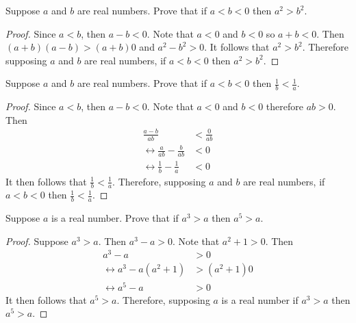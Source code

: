 \begin{tcolorbox}[title=Problem 5, breakable]
    Suppose $a$ and $b$ are real numbers. Prove that if $a < b < 0$ then $a^2 > b^2$.
\end{tcolorbox}

\begin{proof}
    Since $a < b$, then $a - b < 0$. Note that $a < 0$ and $b < 0$ so $a + b < 0$. 
    Then $(a + b)(a - b) > (a + b)0$ and $a^2 - b^2 > 0$. It follows that $a^2 > b^2$.
    Therefore supposing $a$ and $b$ are real numbers, if $a < b < 0$ then $a^2 > b^2$.
\end{proof}

\begin{tcolorbox}[title=Problem 6, breakable]
    Suppose $a$ and $b$ are real numbers. Prove that if $a < b < 0$ then $\frac{1}{b} < \frac{1}{a}$.
\end{tcolorbox}

\begin{proof}
    Since $a < b$, then $a - b < 0$. Note that $a < 0$ and $b < 0$ therefore $ab > 0$. Then
    \begin{align*}
        \frac{a - b}{ab}                            & < \frac{0}{ab} \\
        \leftrightarrow \frac{a}{ab} - \frac{b}{ab} & < 0            \\
        \leftrightarrow \frac{1}{b} - \frac{1}{a}   & < 0 
    \end{align*}
    It then follows that $\frac{1}{b} < \frac{1}{a}$. Therefore, 
    supposing $a$ and $b$ are real numbers, if $a < b < 0$ then $\frac{1}{b} < \frac{1}{a}$.
\end{proof}

\begin{tcolorbox}[title=Problem 7, breakable]
    Suppose $a$ is a real number. Prove that if $a^3 > a$ then $a^5 > a$.
\end{tcolorbox}

\begin{proof}
    Suppose $a^3 > a$. Then $a^3 - a > 0$. Note that $a^2 + 1 > 0$. Then 
    \begin{align*}
        a^3 - a                          & > 0          \\
        \leftrightarrow a^3 - a(a^2 + 1) & > (a^2 + 1)0 \\
        \leftrightarrow a^5 - a          & > 0 
    \end{align*}
    It then follows that $a^5 > a$. Therefore, supposing $a$ is a real number
    if $a^3 > a$ then $a^5 > a$.
\end{proof}


